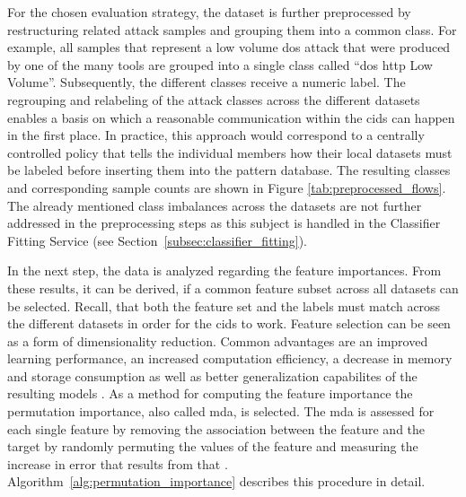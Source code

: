 \documentclass[../../main.tex]{subfiles}
\begin{document}
For the chosen evaluation strategy, the dataset is further preprocessed by restructuring related attack samples and grouping them into a common class. For example, all samples that represent a low volume \gls{dos} attack that were produced by one of the many tools are grouped into a single class called ``\gls{dos} \gls{http} Low Volume''. Subsequently, the different classes receive a numeric label. The regrouping and relabeling of the attack classes across the different datasets enables a basis on which a reasonable communication within the \gls{cids} can happen in the first place. In practice, this approach would correspond to a centrally controlled policy that tells the individual members how their local datasets must be labeled before inserting them into the pattern database. The resulting classes and corresponding sample counts are shown in Figure \ref{tab:preprocessed_flows}. The already mentioned class imbalances across the datasets are not further addressed in the preprocessing steps as this subject is handled in the Classifier Fitting Service (see Section~\ref{subsec:classifier_fitting}).

In the next step, the data is analyzed regarding the feature importances. From these results, it can be derived, if a common feature subset across all datasets can be selected. Recall, that both the feature set and the labels must match across the different datasets in order for the \gls{cids} to work. Feature selection can be seen as a form of dimensionality reduction. Common advantages are an improved learning performance, an increased computation efficiency, a decrease in memory and storage consumption as well as better generalization capabilites of the resulting models \cite{li2017feature}. As a method for computing the feature importance the permutation importance, also called \gls{mda}, is selected. The \gls{mda} is assessed for each single feature by removing the association between the feature and the target by randomly permuting the values of the feature and measuring the increase in error that results from that \cite[125]{rforests_2014}. Algorithm~\ref{alg:permutation_importance} describes this procedure in detail.
\end{document}
